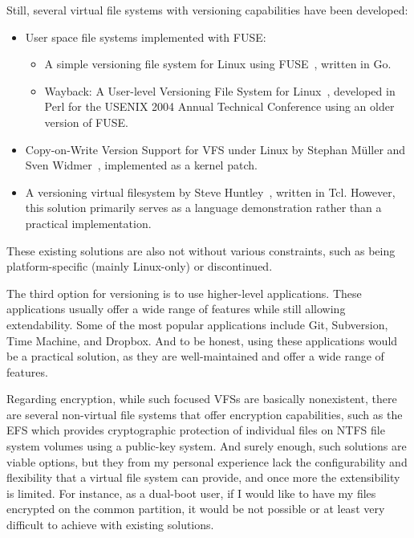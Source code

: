 Still, several virtual file systems with versioning capabilities have been developed:

\begin{itemize}
    \item User space file systems implemented with FUSE:
    \begin{itemize}
        \item A simple versioning file system for Linux using FUSE~\cite{simple_vfs}, written in Go.
        \item Wayback: A User-level Versioning File System for Linux~\cite{wayback_vfs}, developed in Perl for the USENIX 2004 Annual Technical Conference using an older version of FUSE.
    \end{itemize}
    \item Copy-on-Write Version Support for VFS under Linux by Stephan Müller and Sven Widmer~\cite{vvfs}, implemented as a kernel patch.
    \item A versioning virtual filesystem by Steve Huntley~\cite{huntley_vvfs}, written in Tcl.
    However, this solution primarily serves as a language demonstration rather than a practical implementation.
\end{itemize}

These existing solutions are also not without various constraints, such as being platform-specific (mainly Linux-only) or discontinued.

The third option for versioning is to use higher-level applications.
These applications usually offer a wide range of features while still allowing extendability.
Some of the most popular applications include Git, Subversion, Time Machine, and Dropbox.
And to be honest, using these applications would be a practical solution, as they are well-maintained and offer a wide range of features.

Regarding encryption, while such focused VFSs are basically nonexistent, there are several non-virtual file systems that offer encryption capabilities, such as the EFS which provides cryptographic protection of individual files on NTFS file system volumes using a public-key system.
And surely enough, such solutions are viable options, but they from my personal experience lack the configurability and flexibility that a virtual file system can provide, and once more the extensibility is limited.
For instance, as a dual-boot user, if I would like to have my files encrypted on the common partition, it would be not possible or at least very difficult to achieve with existing solutions.

